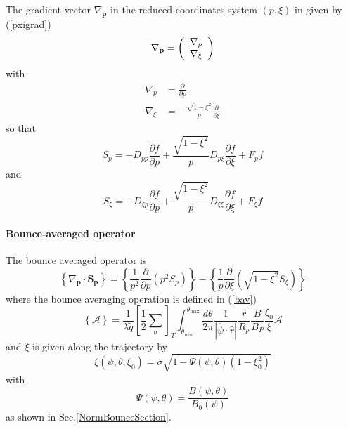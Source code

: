 The gradient vector $\nabla_{\mathbf{p}}$ in the reduced coordinates system
$\left(  p,\xi\right)  $ in given by (\ref{pxigrad})
\begin{equation}
\nabla_{\mathbf{p}}=\left(
\begin{array}
[c]{l}%
\nabla_{p}\\
\nabla_{\xi}%
\end{array}
\right)
\end{equation}
with
\begin{align}
\nabla_{p}  & =\frac{\partial}{\partial p}\\
\nabla_{\xi}  & =-\frac{\sqrt{1-\xi^{2}}}{p}\frac{\partial}{\partial\xi}%
\end{align}
so that
\begin{equation}
S_{p}=-D_{pp}\frac{\partial f}{\partial p}+\frac{\sqrt{1-\xi^{2}}}{p} D_{p\xi
}\frac{\partial f}{\partial\xi}+F_{p}f\label{momflux3}%
\end{equation}
and
\begin{equation}
S_{\xi}=-D_{\xi p}\frac{\partial f}{\partial p}+\frac{\sqrt{1-\xi^{2}}}%
{p}D_{\xi\xi}\frac{\partial f}{\partial\xi}+F_{\xi}f\label{momflux4}%
\end{equation}

\paragraph{Bounce-averaged operator}

The bounce averaged operator is
\begin{equation}
\left\{  \nabla_{\mathbf{p}}\cdot\mathbf{S}_{\mathbf{p}}\right\}  =\left\{
\frac{1}{p^{2}}\frac{\partial}{\partial p}\left(  p^{2}S_{p}\right)  \right\}
-\left\{  \frac{1}{p}\frac{\partial}{\partial\xi}\left(  \sqrt{1-\xi^{2}%
}S_{\xi}\right)  \right\} \label{kinbav}%
\end{equation}
where the bounce averaging operation is defined in (\ref{bav})
\begin{equation}
\left\{  \mathcal{A}\right\}  =\frac{1}{\lambda\widetilde{q}}\left[  \frac
{1}{2}\sum_{\sigma}\right]  _{T}\int_{\theta_{\min}}^{\theta_{\max}}%
\frac{d\theta}{2\pi}\frac{1}{\left|  \widehat{\psi}\cdot\widehat{r}\right|
}\frac{r}{R_{p}}\frac{B}{B_{P}}\frac{\xi_{0}}{\xi}\mathcal{A}%
\end{equation}
and $\xi$ is given along the trajectory by
\begin{equation}
\xi\left(  \psi,\theta,\xi_{0}\right)  =\sigma\sqrt{1-\Psi\left(  \psi
,\theta\right)  \left(  1-\xi_{0}^{2}\right)  }\label{xi2}%
\end{equation}
with
\begin{equation}
\Psi\left(  \psi,\theta\right)  =\frac{B\left(  \psi,\theta\right)  }%
{B_{0}\left(  \psi\right)  }%
\end{equation}
as shown in Sec.\ref{NormBounceSection}.

